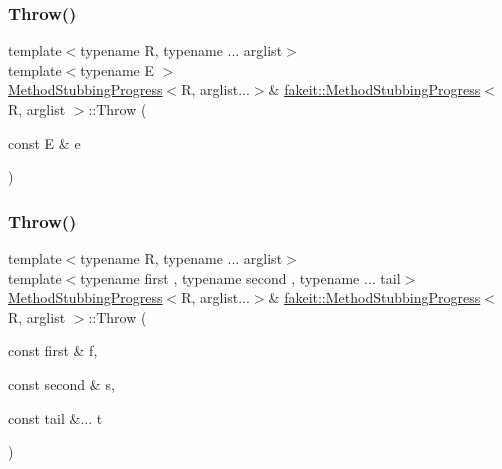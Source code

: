\mbox{\label{structfakeit_1_1MethodStubbingProgress_ae3da30d02ba5de4bfa82f51bba5602c3}} 
\subsubsection{\texorpdfstring{Throw()}{Throw()}\hspace{0.1cm}{\footnotesize\ttfamily [7/27]}}
{\footnotesize\ttfamily template$<$typename R, typename ... arglist$>$ \\
template$<$typename E $>$ \\
\mbox{\hyperlink{structfakeit_1_1MethodStubbingProgress}{Method\+Stubbing\+Progress}}$<$R, arglist...$>$\& \mbox{\hyperlink{structfakeit_1_1MethodStubbingProgress}{fakeit\+::\+Method\+Stubbing\+Progress}}$<$ R, arglist $>$\+::Throw (\begin{DoxyParamCaption}\item[{const E \&}]{e }\end{DoxyParamCaption})\hspace{0.3cm}{\ttfamily [inline]}}

\mbox{\label{structfakeit_1_1MethodStubbingProgress_a516a0ade529c61e4ab6df1bf47f3f1b2}} 
\subsubsection{\texorpdfstring{Throw()}{Throw()}\hspace{0.1cm}{\footnotesize\ttfamily [8/27]}}
{\footnotesize\ttfamily template$<$typename R, typename ... arglist$>$ \\
template$<$typename first , typename second , typename ... tail$>$ \\
\mbox{\hyperlink{structfakeit_1_1MethodStubbingProgress}{Method\+Stubbing\+Progress}}$<$R, arglist...$>$\& \mbox{\hyperlink{structfakeit_1_1MethodStubbingProgress}{fakeit\+::\+Method\+Stubbing\+Progress}}$<$ R, arglist $>$\+::Throw (\begin{DoxyParamCaption}\item[{const first \&}]{f,  }\item[{const second \&}]{s,  }\item[{const tail \&...}]{t }\end{DoxyParamCaption})\hspace{0.3cm}{\ttfamily [inline]}}

